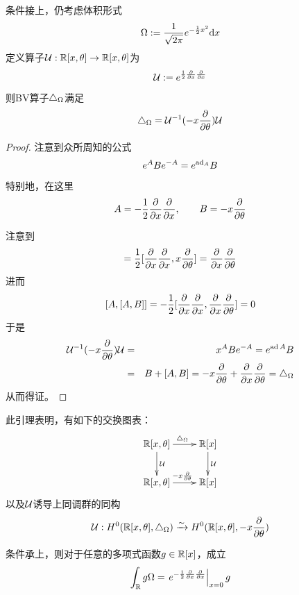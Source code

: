 \begin{lemma}条件接上，仍考虑体积形式
$$\Omega:=\frac{1}{\sqrt{2\pi}}e^{-\frac{1}{2}x^2}\mathrm{d} x$$
定义算子$\mathcal{U}:\mathbb{R}[x,\theta]\to\mathbb{R}[x,\theta]$为
$$\mathcal{U}:=
  e^{\frac{1}{2}\frac{\partial } {\partial x}\frac{\partial } {\partial x}}$$
则BV算子$\triangle_\Omega$满足
$$\triangle_{\Omega}=\mathcal{U}^{-1}(-x\frac{\partial } {\partial \theta})\mathcal{U}$$
\end{lemma}

\begin{proof}注意到众所周知的公式%
$$e^ABe^{-A}=e^{\operatorname{ad}_A}B$$%
特别地，在这里%
$$A=-\frac{1}{2}\frac{\partial } {\partial x}\frac{\partial } {\partial x},\qquad B=-x\frac{\partial } {\partial \theta}$$%

注意到
\begin{eqnarray*}
[A,B]=  
     \frac{1}{2}
     [\pp{x}\pp{x},x\pp{\theta}]
=    \pp{x}\pp{\theta}
\end{eqnarray*}
进而
$$[A,[A,B]]=-\frac{1}{2}[\frac{\partial } {\partial x}\frac{\partial } {\partial x},\frac{\partial } {\partial x}\frac{\partial } {\partial \theta}]=0$$
于是
\begin{eqnarray*}
     \mathcal{U}^{-1}(-x\frac{\partial } {\partial \theta})\mathcal{U}
&=&
     x^ABe^{-A}
 =
     e^{\operatorname{ad} A}B\\
&=&
     B+[A,B]
 =
     -x\frac{\partial } {\partial \theta}+\frac{\partial } {\partial x}\frac{\partial } {\partial \theta}
 =
     \triangle_\Omega
\end{eqnarray*}
从而得证。
\end{proof}

此引理表明，有如下的交换图表：
$$
  \xymatrix{
     \bbR[x,\theta] \ar[r]^{\yc_\Omg}  \ar[d]^{\mcalU}
    &\bbR[x]                           \ar[d]^{\mcalU}
  \\
     \bbR[x,\theta] \ar[r]^{-x\pp{\theta}}
    &\bbR[x]
  }
$$
以及$\mathcal{U}$诱导上同调群的同构
$$\mathcal{U}:H^0(\mathbb{R}[x,\theta],\triangle_\Omega)
\xrightarrow{\sim}H^0(\mathbb{R}[x,\theta],-x\frac{\partial } {\partial \theta})$$


\begin{prop}条件承上，则对于任意的多项式函数$g\in\mathbb{R}[x]$，成立
$$
  \int_{\mathbb{R}} g\Omega
=\left.
   e^{-\frac{1}{2}\frac{\partial } {\partial x}\frac{\partial } {\partial x}}
 \right|_{x=0}g
$$
\end{prop}

